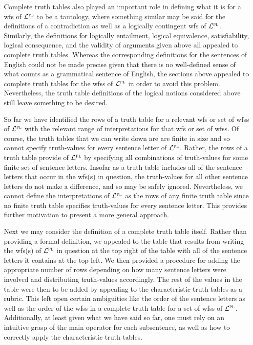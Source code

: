 Complete truth tables also played an important role in defining what it is for a wfs of $\mathcal{L}^{\textsc{pl}}$ to be a tautology, where something similar may be said for the definitions of a contradiction as well as a logically contingent wfs of $\mathcal{L}^{\textsc{pl}}$. 
Similarly, the definitions for logically entailment, logical equivalence, satisfiability, logical consequence, and the validity of arguments given above all appealed to complete truth tables.
Whereas the corresponding definitions for the sentences of English could not be made precise given that there is no well-defined sense of what counts as a grammatical sentence of English, the sections above appealed to complete truth tables for the wfss of $\mathcal{L}^{\textsc{pl}}$ in order to avoid this problem. %
Nevertheless, the truth table definitions of the logical notions considered above still leave something to be desired.

So far we have identified the rows of a truth table for a relevant wfs or set of wfss of $\mathcal{L}^{\textsc{pl}}$ with the relevant range of interpretations for that wfs or set of wfss.
Of course, the truth tables that we can write down are are finite in size and so cannot specify truth-values for every sentence letter of $\mathcal{L}^{\textsc{pl}}$.
Rather, the rows of a truth table provide  of $\mathcal{L}^{\textsc{pl}}$ by specifying all combinations of truth-values for some finite set of sentence letters.
Insofar as a truth table includes all of the sentence letters that occur in the wfs(s) in question, the truth-values for all other sentence letters do not make a difference, and so may be safely ignored.
Nevertheless, we cannot define the interpretations of $\mathcal{L}^{\textsc{pl}}$ as the rows of any finite truth table since no finite truth table specifies truth-values for every sentence letter.
This provides further motivation to present a more general approach.

Next we may consider the definition of a complete truth table itself.
Rather than providing a formal definition, we appealed to the table that results from writing the wfs(s) of $\mathcal{L}^{\textsc{pl}}$ in question at the top right of the table with all of the sentence letters it contains at the top left. 
We then provided a procedure for adding the appropriate number of rows depending on how many sentence letters were involved and distributing truth-values accordingly.
The rest of the values in the table were then to be added by appealing to the characteristic truth tables as a rubric.
This left open certain ambiguities like the order of the sentence letters as well as the order of the wfss in a complete truth table for a set of wfss of $\mathcal{L}^{\textsc{pl}}$.
Additionally, at least given what we have said so far, one must rely on an intuitive grasp of the main operator for each subsentence, as well as how to correctly apply the characteristic truth tables.

